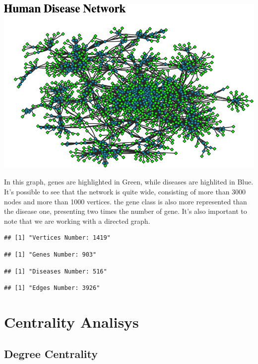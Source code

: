 \documentclass[
]{article}
\begin{document}
\includegraphics{HumanDiseaseNetwork_files/figure-latex/graph-1.pdf}

In this graph, genes are highlighted in Green, while diseases are highlited in Blue. It's possible to see that the network is quite wide, consisting of more than 3000 nodes and more than 1000 vertices.
the gene class is also more represented than the disease one, presenting two times the number of gene. It's also important to note that we are working with a directed graph.

\begin{verbatim}
## [1] "Vertices Number: 1419"
\end{verbatim}

\begin{verbatim}
## [1] "Genes Number: 903"
\end{verbatim}

\begin{verbatim}
## [1] "Diseases Number: 516"
\end{verbatim}

\begin{verbatim}
## [1] "Edges Number: 3926"
\end{verbatim}

\hypertarget{centrality-analisys}{%
\section{Centrality Analisys}\label{centrality-analisys}}

\hypertarget{degree-centrality}{%
\subsection{Degree Centrality}\label{degree-centrality}}
\end{document}
